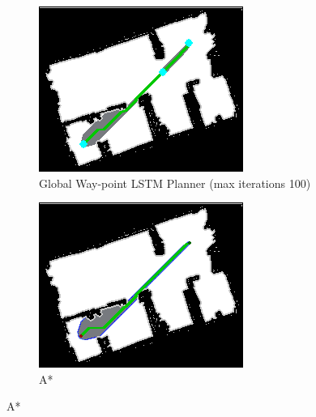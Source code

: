 \begin{figure}[]
  \centering
  \begin{subfigure}[b]{0.38\linewidth}
    \includegraphics[width=\linewidth]{images/screenshot_141.png}
     \caption{Global Way-point LSTM Planner (max iterations 100)}
  \end{subfigure}
  \hfill
  \begin{subfigure}[b]{0.38\linewidth}
    \includegraphics[width=\linewidth]{images/screenshot_116.png}
     \caption{A*\newline}
  \end{subfigure}

\end{figure}
